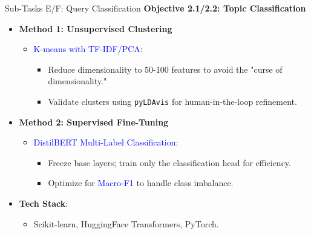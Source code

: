 \documentclass{beamer}
\begin{document}
\begin{frame}{Sub-Tasks E/F: Query Classification}
\footnotesize
\textbf{Objective 2.1/2.2: Topic Classification}
\begin{itemize}
    \item \textbf{Method 1: Unsupervised Clustering}
    \begin{itemize}
        \item \textcolor{blue}{K-means with TF-IDF/PCA}:
        \begin{itemize}
            \item Reduce dimensionality to 50-100 features to avoid the "curse of dimensionality."
            \item Validate clusters using \texttt{pyLDAvis} for human-in-the-loop refinement.
        \end{itemize}
    \end{itemize}
    
    \item \textbf{Method 2: Supervised Fine-Tuning}
    \begin{itemize}
        \item \textcolor{blue}{DistilBERT Multi-Label Classification}:
        \begin{itemize}
            \item Freeze base layers; train only the classification head for efficiency.
            \item Optimize for \textcolor{blue}{Macro-F1} to handle class imbalance.
        \end{itemize}
    \end{itemize}
    
    \item \textbf{Tech Stack}:
    \begin{itemize}
        \item Scikit-learn, HuggingFace Transformers, PyTorch.
    \end{itemize}
\end{itemize}
\end{frame}
\end{document}
